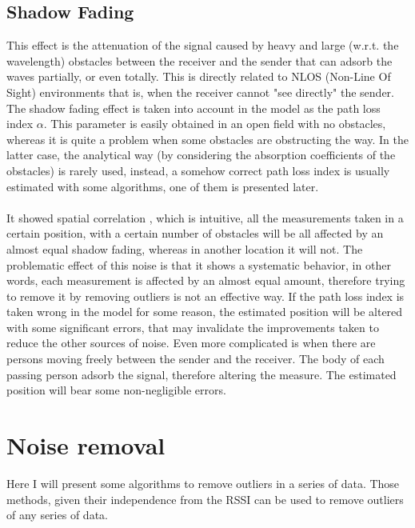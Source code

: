 \documentclass[12pt,twoside]{report}
\begin{document}
\section{Shadow Fading}
This effect is the attenuation of the signal caused by heavy and large (w.r.t. the wavelength) obstacles between the receiver and the sender that can adsorb the waves partially, or even totally. This is directly related to NLOS (Non-Line Of Sight) environments that is, when the receiver cannot "see directly" the sender. The shadow fading effect is taken into account in the model as the path loss index $\alpha$. This parameter is easily obtained in an open field with no obstacles, whereas it is quite a problem when some obstacles are obstructing the way. In the latter case, the analytical way (by considering the absorption coefficients of the obstacles) is rarely used, instead, a somehow correct path loss index is usually estimated with some algorithms, one of them is presented later.\\\\ 
It showed spatial correlation \cite{244122,732812}, which is intuitive, all the measurements taken in a certain position, with a certain number of obstacles will be all affected by an almost equal shadow fading, whereas in another location it will not. The problematic effect of this noise is that it shows a systematic behavior, in other words, each measurement is affected by an almost equal amount, therefore trying to remove it by removing outliers is not an effective way. If the path loss index is taken wrong in the model for some reason, the estimated position will be altered with some significant errors, that may invalidate the improvements taken to reduce the other sources of noise. Even more complicated is when there are persons moving freely between the sender and the receiver. The body of each passing person adsorb the signal, therefore altering the measure. The estimated position will bear some non-negligible errors.

\chapter{Noise removal}
Here I will present some algorithms to remove outliers in a series of data. Those methods, given their independence from the RSSI can be used to remove outliers of any series of data.
\end{document}
